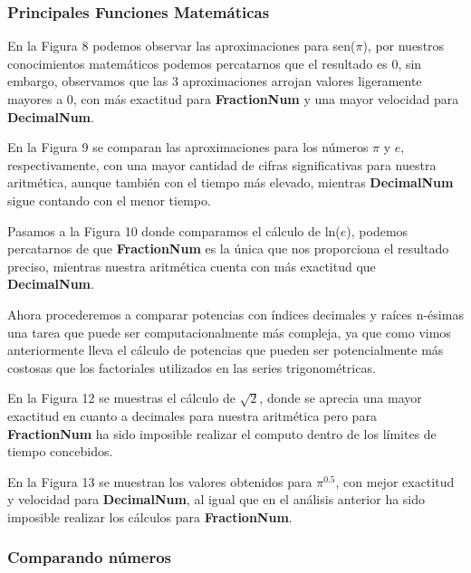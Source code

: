 \documentclass[a4paper,10pt,twocolumn]{article}
\begin{document}
\subsubsection{Principales Funciones Matemáticas}\label{sub:math_func}


En la Figura 8 podemos observar las aproximaciones para sen($\pi$), por nuestros conocimientos matemáticos podemos percatarnos que el resultado es 0, sin embargo, observamos que las 3 aproximaciones arrojan valores ligeramente mayores a 0, con más exactitud para \textbf{FractionNum} y una mayor velocidad para \textbf{DecimalNum}.

En la Figura 9 se comparan las aproximaciones para los números $\pi$ y $e$, respectivamente, con una mayor cantidad de cifras significativas para nuestra aritmética, aunque también con el tiempo más elevado, mientras \textbf{DecimalNum} sigue contando con el menor tiempo. 

Pasamos a la Figura 10 donde comparamos el cálculo de ln($e$), podemos percatarnos de que \textbf{FractionNum} es la única que nos proporciona el resultado preciso, mientras nuestra aritmética cuenta con más exactitud que \textbf{DecimalNum}.

Ahora procederemos a comparar potencias con índices decimales y raíces n-ésimas una tarea que puede ser computacionalmente más compleja, ya que como vimos anteriormente lleva el cálculo de potencias que pueden ser potencialmente más costosas que los factoriales utilizados en las series trigonométricas.

En la Figura 12 se muestras el cálculo de $\sqrt{2}$, donde se aprecia una mayor exactitud en cuanto a decimales para nuestra aritmética pero para \textbf{FractionNum} ha sido imposible realizar el computo dentro de los límites de tiempo concebidos.

En la Figura 13 se muestran los valores obtenidos para $\pi^{0.5}$, con mejor exactitud y velocidad para \textbf{DecimalNum}, al igual que en el análisis anterior ha sido imposible realizar los cálculos para \textbf{FractionNum}.

\subsubsection{Comparando números}\label{sub:number_comp}
\end{document}
